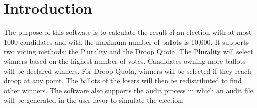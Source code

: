 \hypertarget{index_intro_sec}{}\section{Introduction}\label{index_intro_sec}
The purpose of this software is to calculate the result of an election with at most 1000 candidates and with the maximum number of ballots is 10,000. It supports two voting methods\+: the Plurality and the Droop Quota. The Plurality will select winners based on the highest number of votes. Candidates owning more ballots will be declared winners. For Droop Quota, winners will be selected if they reach droop at any point. The ballots of the losers will then be redistributed to find other winners. The software also supports the audit process in which an audit file will be generated in the user favor to simulate the election. 